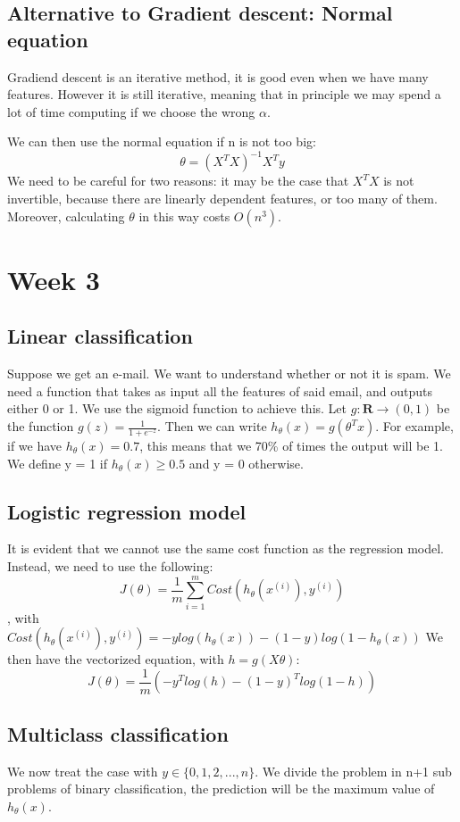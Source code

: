 \documentclass{article}
\begin{document}
\subsection{Alternative to Gradient descent: Normal equation}
Gradiend descent is an iterative method, it is good even when we have many features.
However it is still iterative, meaning that in principle we may spend a lot of time
computing if we choose the wrong $\alpha$.

We can then use the normal equation if n is not too big:
$$ \theta = (X^T X )^{-1} X^T y $$
We need to be careful for two reasons: it may be the case that $X^T X$ is not
invertible, because there are linearly dependent features, or too many of them.
Moreover, calculating $\theta$ in this way costs $O(n^3)$.

\section{Week 3}
\subsection{Linear classification}
Suppose we get an e-mail. We want to understand whether or not it is spam.
We need a function that takes as input all the features of said email, and
outputs either 0 or 1. We use the sigmoid function to achieve this.
Let $ g : \mathbf{R} \to (0,1) $ be the function $g(z) = \frac{1}{1+e^{-z}}$.
Then we can write $h_\theta(x) = g(\theta^T x)$.
For example, if we have $h_\theta(x) = 0.7$, this means that we 70\% of times the
output will be 1. We define y = 1 if $h_\theta(x) \geq 0.5$ and y = 0 otherwise.

\subsection{Logistic regression model}
It is evident that we cannot use the same cost function as the regression model.
Instead, we need to use the following:
$$ J(\theta) = \frac{1}{m}\sum_{i=1}^m Cost(h_\theta(x^{(i)}),y^{(i)}) $$,
with $Cost(h_\theta(x^{(i)}),y^{(i)}) =
-ylog(h_\theta(x)) - (1-y)log(1-h_\theta(x))$
We then have the vectorized equation, with $h = g(X\theta)$:
$$ J(\theta) = \frac{1}{m}(-y^Tlog(h)-(1-y)^Tlog(1-h)) $$

\subsection{Multiclass classification}
We now treat the case with $y \in \{0,1,2,...,n\}.$
We divide the problem in n+1 sub problems of binary classification, the prediction
will be the maximum value of $h_\theta(x)$.
\end{document}
